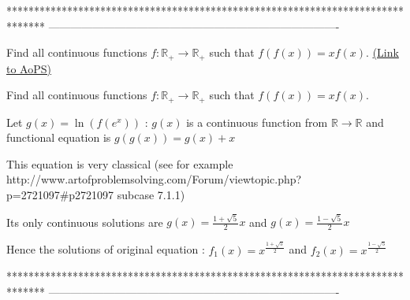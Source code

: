 *******************************************************************************
-------------------------------------------------------------------------------

\begin{problem}
	Find all continuous functions $f : \mathbb{R}_+ \rightarrow \mathbb{R}_+$ such that $f(f(x))=xf(x).$
	\flushright \href{https://artofproblemsolving.com/community/c6h535710}{(Link to AoPS)}
\end{problem}



\begin{solution}
	\begin{tcolorbox}Find all continuous functions $f : \mathbb{R}_+ \rightarrow \mathbb{R}_+$ such that $f(f(x))=xf(x).$\end{tcolorbox}
Let $g(x)=\ln(f(e^x))$ : $g(x)$ is a continuous function from $\mathbb R\to\mathbb R$ and functional equation is $g(g(x))=g(x)+x$

This equation is very classical (see for example http://www.artofproblemsolving.com/Forum/viewtopic.php?p=2721097#p2721097  subcase 7.1.1)

Its only continuous solutions are $g(x)=\frac{1+\sqrt 5}2x$ and  $g(x)=\frac{1-\sqrt 5}2x$

Hence the solutions of original equation : $\boxed{f_1(x)=x^{\frac{1+\sqrt 5}2}}$ and $\boxed{f_2(x)=x^{\frac{1-\sqrt 5}2}}$
\end{solution}
*******************************************************************************
-------------------------------------------------------------------------------

